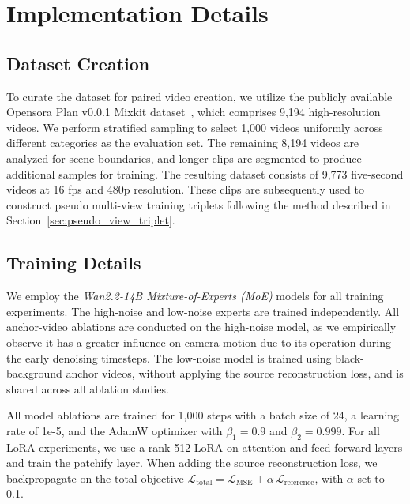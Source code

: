
\section{Implementation Details}
\label{sec:implementation}


\subsection{Dataset Creation}
\label{sec:dataset_creation}

To curate the dataset for paired video creation, we utilize the publicly available Opensora Plan v0.0.1 Mixkit dataset~\cite{lin2024open}, which comprises 9,194 high-resolution videos. We perform stratified sampling to select 1,000 videos uniformly across different categories as the evaluation set. The remaining 8,194 videos are analyzed for scene boundaries, and longer clips are segmented to produce additional samples for training. The resulting dataset consists of 9,773 five-second videos at 16 fps and 480p resolution. These clips are subsequently used to construct pseudo multi-view training triplets following the method described in Section~\ref{sec:pseudo_view_triplet}.


\subsection{Training Details}
We employ the \textit{Wan2.2-14B Mixture-of-Experts (MoE)} models for all training experiments. The high-noise and low-noise experts are trained independently. All anchor-video ablations are conducted on the high-noise model, as we empirically observe it has a greater influence on camera motion due to its operation during the early denoising timesteps. The low-noise model is trained using black-background anchor videos, without applying the source reconstruction loss, and is shared across all ablation studies.

All model ablations are trained for 1{,}000 steps with a batch size of 24, a learning rate of 1e-5, and the AdamW optimizer with $\beta_1=0.9$ and $\beta_2=0.999$. For all LoRA experiments, we use a rank-512 LoRA on attention and feed-forward layers and train the patchify layer. When adding the source reconstruction loss, we backpropagate on the total objective $\mathcal{L}_{\text{total}} = \mathcal{L}_{\text{MSE}} + \alpha \,\mathcal{L}_{\text{reference}}$, with $\alpha$ set to 0.1.